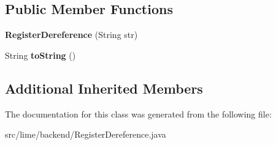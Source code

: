 \subsection*{Public Member Functions}
\begin{DoxyCompactItemize}
\item 
\mbox{\label{classlime_1_1backend_1_1RegisterDereference_a0cd39b3f415b747472fd456751186624}} 
{\bfseries Register\+Dereference} (String str)
\item 
\mbox{\label{classlime_1_1backend_1_1RegisterDereference_a9ecdc687544a8c54aaa4e4cb8c2ce7ce}} 
String {\bfseries to\+String} ()
\end{DoxyCompactItemize}
\subsection*{Additional Inherited Members}


The documentation for this class was generated from the following file\+:\begin{DoxyCompactItemize}
\item 
src/lime/backend/Register\+Dereference.\+java\end{DoxyCompactItemize}
